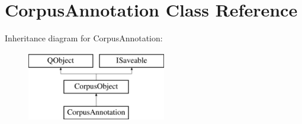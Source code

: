 \hypertarget{class_corpus_annotation}{}\section{Corpus\+Annotation Class Reference}
\label{class_corpus_annotation}
Inheritance diagram for Corpus\+Annotation\+:\begin{figure}[H]
\begin{center}
\leavevmode
\includegraphics[height=3.000000cm]{class_corpus_annotation}
\end{center}
\end{figure}
